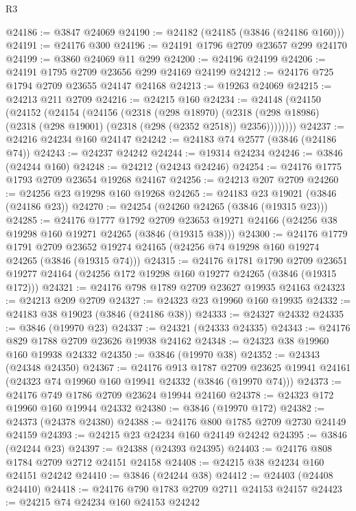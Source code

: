 \begin{lexlean}{R3}
\begin{coremodule}
@24186 := @3847 @24069
@24190 := @24182 (@24185 (@3846 (@24186 @160)))
@24191 := @24176 @300
@24196 := @24191 @1796 @2709 @23657 @299 @24170
@24199 := @3860 @24069 @11 @299
@24200 := @24196 @24199
@24206 := @24191 @1795 @2709 @23656 @299 @24169 @24199
@24212 := @24176 @725 @1794 @2709 @23655 @24147 @24168
@24213 := @19263 @24069
@24215 := @24213 @211 @2709
@24216 := @24215 @160
@24234 := @24148
    (@24150
      (@24152
        (@24154
          (@24156
            (@2318
              (@298 @18970)
              (@2318 (@298 @18986) (@2318 (@298 @19001) (@2318 (@298 (@2352 @2518)) @2356))))))))
@24237 := @24216 @24234 @160 @24147
@24242 := @24183 @74 @2577 (@3846 (@24186 @74))
@24243 := @24237 @24242
@24244 := @19314 @24234
@24246 := @3846 (@24244 @160)
@24248 := @24212 (@24243 @24246)
@24254 := @24176 @1775 @1793 @2709 @23654 @19268 @24167
@24256 := @24213 @207 @2709
@24260 := @24256 @23 @19298 @160 @19268
@24265 := @24183 @23 @19021 (@3846 (@24186 @23))
@24270 := @24254 (@24260 @24265 (@3846 (@19315 @23)))
@24285 := @24176
    @1777
    @1792
    @2709
    @23653
    @19271
    @24166
    (@24256 @38 @19298 @160 @19271 @24265 (@3846 (@19315 @38)))
@24300 := @24176
    @1779
    @1791
    @2709
    @23652
    @19274
    @24165
    (@24256 @74 @19298 @160 @19274 @24265 (@3846 (@19315 @74)))
@24315 := @24176
    @1781
    @1790
    @2709
    @23651
    @19277
    @24164
    (@24256 @172 @19298 @160 @19277 @24265 (@3846 (@19315 @172)))
@24321 := @24176 @798 @1789 @2709 @23627 @19935 @24163
@24323 := @24213 @209 @2709
@24327 := @24323 @23 @19960 @160 @19935
@24332 := @24183 @38 @19023 (@3846 (@24186 @38))
@24333 := @24327 @24332
@24335 := @3846 (@19970 @23)
@24337 := @24321 (@24333 @24335)
@24343 := @24176 @829 @1788 @2709 @23626 @19938 @24162
@24348 := @24323 @38 @19960 @160 @19938 @24332
@24350 := @3846 (@19970 @38)
@24352 := @24343 (@24348 @24350)
@24367 := @24176
    @913
    @1787
    @2709
    @23625
    @19941
    @24161
    (@24323 @74 @19960 @160 @19941 @24332 (@3846 (@19970 @74)))
@24373 := @24176 @749 @1786 @2709 @23624 @19944 @24160
@24378 := @24323 @172 @19960 @160 @19944 @24332
@24380 := @3846 (@19970 @172)
@24382 := @24373 (@24378 @24380)
@24388 := @24176 @800 @1785 @2709 @2730 @24149 @24159
@24393 := @24215 @23 @24234 @160 @24149 @24242
@24395 := @3846 (@24244 @23)
@24397 := @24388 (@24393 @24395)
@24403 := @24176 @808 @1784 @2709 @2712 @24151 @24158
@24408 := @24215 @38 @24234 @160 @24151 @24242
@24410 := @3846 (@24244 @38)
@24412 := @24403 (@24408 @24410)
@24418 := @24176 @790 @1783 @2709 @2711 @24153 @24157
@24423 := @24215 @74 @24234 @160 @24153 @24242

\end{coremodule}
\end{lexlean}
